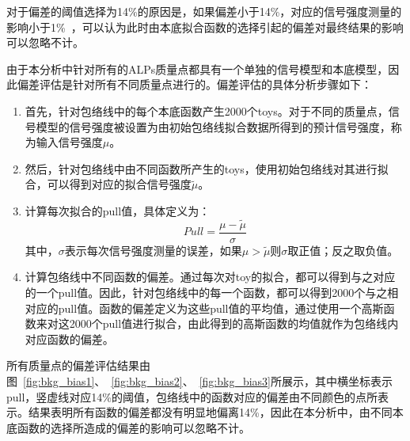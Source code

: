对于偏差的阈值选择为14\%的原因是，如果偏差小于14\%，对应的信号强度测量的影响小于1\%~\cite{Khachatryan:2014ira}，可以认为此时由本底拟合函数的选择引起的偏差对最终结果的影响可以忽略不计。

由于本分析中针对所有的ALPs质量点都具有一个单独的信号模型和本底模型，因此偏差评估是针对所有不同质量点进行的。偏差评估的具体分析步骤如下：
\begin{enumerate}
    \item 首先，针对包络线中的每个本底函数产生2000个toys。对于不同的质量点，信号模型的信号强度被设置为由初始包络线拟合数据所得到的预计信号强度，称为输入信号强度$\mu$。
    \item 然后，针对包络线中由不同函数所产生的toys，使用初始包络线对其进行拟合，可以得到对应的拟合信号强度$\tilde{\mu}$。
    \item 计算每次拟合的pull值，具体定义为：
    \begin{equation}
    Pull = \frac{\mu-\tilde{\mu}}{\sigma}
    \end{equation}
    其中，$\sigma$表示每次信号强度测量的误差，如果$\mu>\tilde{\mu}$则$\sigma$取正值；反之取负值。
    \item 计算包络线中不同函数的偏差。通过每次对toy的拟合，都可以得到与之对应的一个pull值。因此，针对包络线中的每一个函数，都可以得到2000个与之相对应的pull值。函数的偏差定义为这些pull值的平均值，通过使用一个高斯函数来对这2000个pull值进行拟合，由此得到的高斯函数的均值就作为包络线内对应函数的偏差。
\end{enumerate}

所有质量点的偏差评估结果由图~\ref{fig:bkg_bias1}、~\ref{fig:bkg_bias2}、~\ref{fig:bkg_bias3}所展示，其中横坐标表示pull，竖虚线对应14\%的阈值，包络线中的函数对应的偏差由不同颜色的点所表示。结果表明所有函数的偏差都没有明显地偏离14\%，因此在本分析中，由不同本底函数的选择所造成的偏差的影响可以忽略不计。

